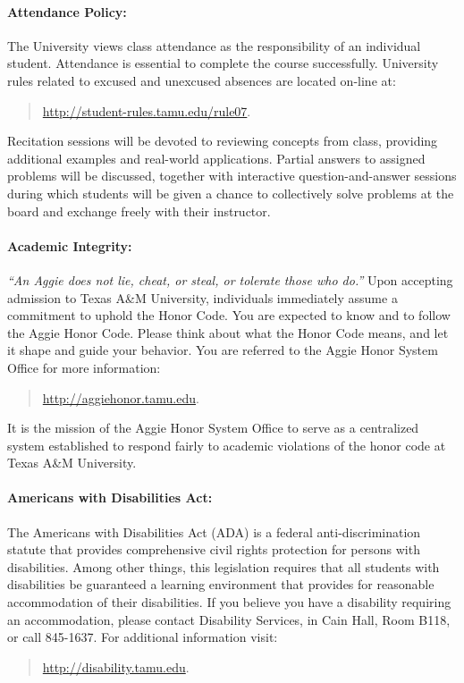 \documentclass[letterpaper,11pt]{article}
\begin{document}
\paragraph{Attendance Policy:}
The University views class attendance as the responsibility of an individual student.
Attendance is essential to complete the course successfully.
University rules related to excused and unexcused absences are located on-line at:
\begin{quote}
\url{http://student-rules.tamu.edu/rule07}.
\end{quote}
Recitation sessions will be devoted to reviewing concepts from class, providing additional examples and real-world applications.
Partial answers to assigned problems will be discussed, together with interactive question-and-answer sessions during which students will be given a chance to collectively solve problems at the board and exchange freely with their instructor.

\paragraph{Academic Integrity:}
\emph{``An Aggie does not lie, cheat, or steal, or tolerate those who do.''}
Upon accepting admission to Texas A\&M University, individuals immediately assume a commitment to uphold the Honor Code.
You are expected to know and to follow the Aggie Honor Code.
Please think about what the Honor Code means, and let it shape and guide your behavior.
You are referred to the Aggie Honor System Office for more information:
\begin{quote}
\url{http://aggiehonor.tamu.edu}.
\end{quote}
It is the mission of the Aggie Honor System Office to serve as a centralized system established to respond fairly to academic violations of the honor code at Texas A\&M University.

\paragraph{Americans with Disabilities Act:}
The Americans with Disabilities Act (ADA) is a federal anti-discrimination statute that provides comprehensive civil rights protection for persons with disabilities.
Among other things, this legislation requires that all students with disabilities be guaranteed a learning environment that provides for reasonable accommodation of their disabilities.
If you believe you have a disability requiring an accommodation, please contact Disability Services, in Cain Hall, Room B118, or call 845-1637.
For additional information visit:
\begin{quote}
\url{http://disability.tamu.edu}.
\end{quote}
\end{document}
